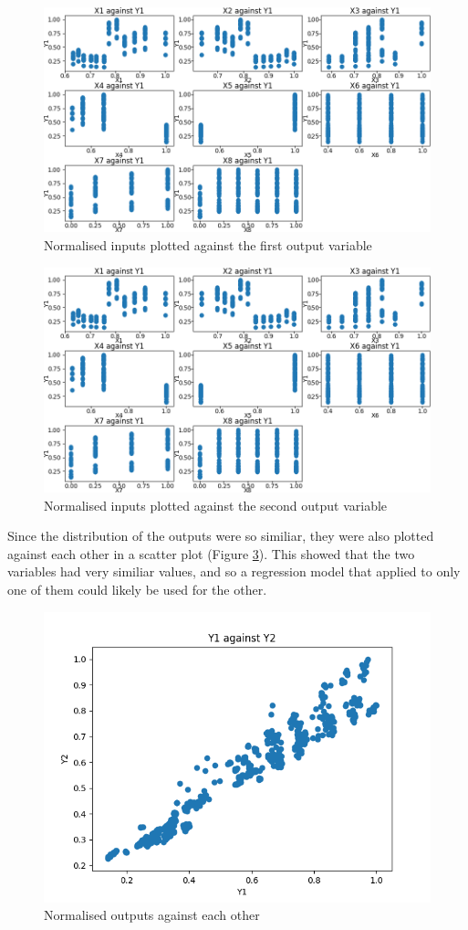 \documentclass[12pt]{article}
\begin{document}
\begin{figure}[!ht]
\centering
\includegraphics[width=0.8 \linewidth]{images/XsVsY0}
\caption{Normalised inputs plotted against the first output variable}
\label{fig:xvsy0}
\end{figure}

\begin{figure}[!ht]
\centering
\includegraphics[width=0.8 \linewidth]{images/XsVsY0}
\caption{Normalised inputs plotted against the second output variable}
\label{fig:xvsy1}
\end{figure}

\FloatBarrier

Since the distribution of the outputs were so similiar, they were also plotted against each other in a scatter plot (Figure \ref{fig:y1vsy2}). This showed that the two variables had very similiar values, and so a regression model that applied to only one of them could likely be used for the other.

\begin{figure}[!ht]
\centering
\includegraphics[width=0.8 \linewidth]{images/Y1vsY2}
\caption{Normalised outputs against each other}
\label{fig:y1vsy2}
\end{figure}
\end{document}
